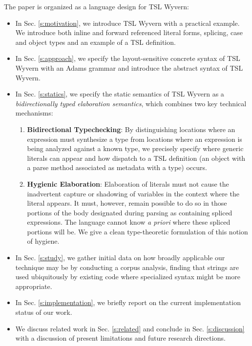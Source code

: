 The paper is organized as a language design for TSL Wyvern:
\begin{itemize}
\item In Sec. \ref{s:motivation}, we introduce TSL Wyvern with a practical example. We introduce  both inline and forward referenced literal forms, splicing, case and object types and an example of a TSL definition.
\item In Sec. \ref{s:approach}, we specify the layout-sensitive concrete syntax of TSL Wyvern with an Adams grammar and introduce the abstract syntax of TSL Wyvern.
\item In Sec. \ref{s:statics}, we specify the static semantics of TSL Wyvern as a \emph{bidirectionally typed elaboration semantics}, which combines two key technical mechanisms: 
\begin{enumerate}
\item \textbf{Bidirectional Typechecking}: By distinguishing locations where an expression must synthesize a type from locations where an expression is being analyzed against a known type, we precisely specify where generic literals can appear and how dispatch to a TSL definition (an object with a parse method associated as metadata with a type) occurs.
\item \textbf{Hygienic Elaboration}: Elaboration of literals must not cause the inadvertent capture or shadowing of variables in the context where the literal appears. It must, however, remain possible to do so in those portions of the body designated during parsing as containing spliced expressions. The language cannot know \emph{a priori} where these spliced portions will be. We give a clean type-theoretic formulation of this notion of hygiene.
\end{enumerate}
\item In Sec. \ref{s:study}, we gather initial data on how broadly applicable our technique may be by conducting a corpus analysis, finding that strings are used ubiquitously by existing code where specialized syntax might be more appropriate.
\item In Sec. \ref{s:implementation}, we briefly report on the current implementation status of our work. 
\item We discuss related work in Sec. \ref{s:related} and conclude in Sec. \ref{s:discussion} with a discussion of present limitations and future research directions.
\end{itemize}

